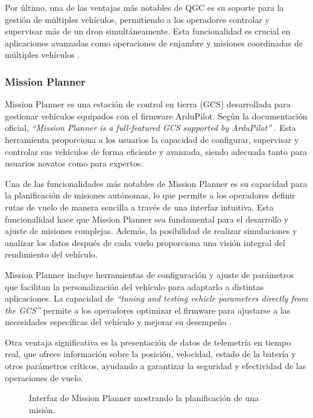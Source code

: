     Por último, una de las ventajas más notables de QGC es su soporte para la gestión de múltiples vehículos, permitiendo a los operadores controlar y supervisar más de un dron simultáneamente. Esta funcionalidad es crucial en aplicaciones avanzadas como operaciones de enjambre y misiones coordinadas de múltiples vehículos \cite{qgc_docs}.

    \subsubsection{Mission Planner}
    Mission Planner es una estación de control en tierra (GCS) desarrollada para gestionar vehículos equipados con el firmware ArduPilot. Según la documentación oficial, \textit{“Mission Planner is a full-featured GCS supported by ArduPilot”} \cite{ardupilot_docs}. Esta herramienta proporciona a los usuarios la capacidad de configurar, supervisar y controlar sus vehículos de forma eficiente y avanzada, siendo adecuada tanto para usuarios novatos como para expertos.

    Una de las funcionalidades más notables de Mission Planner es su capacidad para la planificación de misiones autónomas, lo que permite a los operadores definir rutas de vuelo de manera sencilla a través de una interfaz intuitiva. Esta funcionalidad hace que Mission Planner sea fundamental para el desarrollo y ajuste de misiones complejas. Además, la posibilidad de realizar simulaciones y analizar los datos después de cada vuelo proporciona una visión integral del rendimiento del vehículo.

    Mission Planner incluye herramientas de configuración y ajuste de parámetros que facilitan la personalización del vehículo para adaptarlo a distintas aplicaciones. La capacidad de \textit{“tuning and testing vehicle parameters directly from the GCS”} permite a los operadores optimizar el firmware para ajustarse a las necesidades específicas del vehículo y mejorar su desempeño \cite{ardupilot_docs}.

    Otra ventaja significativa es la presentación de datos de telemetría en tiempo real, que ofrece información sobre la posición, velocidad, estado de la batería y otros parámetros críticos, ayudando a garantizar la seguridad y efectividad de las operaciones de vuelo.

    \begin{figure}[h!] 
    \centering 
    \caption{Interfaz de Mission Planner mostrando la planificación de una misión.} 
    \label{fig:mission_planner}
    \end{figure}

